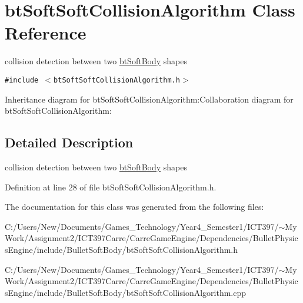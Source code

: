 \hypertarget{classbt_soft_soft_collision_algorithm}{
\section{btSoftSoftCollisionAlgorithm Class Reference}
\label{classbt_soft_soft_collision_algorithm}
}
collision detection between two \hyperlink{classbt_soft_body}{btSoftBody} shapes  


{\tt \#include $<$btSoftSoftCollisionAlgorithm.h$>$}

Inheritance diagram for btSoftSoftCollisionAlgorithm:Collaboration diagram for btSoftSoftCollisionAlgorithm:

\subsection{Detailed Description}
collision detection between two \hyperlink{classbt_soft_body}{btSoftBody} shapes 

Definition at line 28 of file btSoftSoftCollisionAlgorithm.h.

The documentation for this class was generated from the following files:\begin{CompactItemize}
\item 
C:/Users/New/Documents/Games\_\-Technology/Year4\_\-Semester1/ICT397/$\sim$My Work/Assignment2/ICT397Carre/CarreGameEngine/Dependencies/BulletPhysicsEngine/include/BulletSoftBody/btSoftSoftCollisionAlgorithm.h\item 
C:/Users/New/Documents/Games\_\-Technology/Year4\_\-Semester1/ICT397/$\sim$My Work/Assignment2/ICT397Carre/CarreGameEngine/Dependencies/BulletPhysicsEngine/include/BulletSoftBody/btSoftSoftCollisionAlgorithm.cpp\end{CompactItemize}

